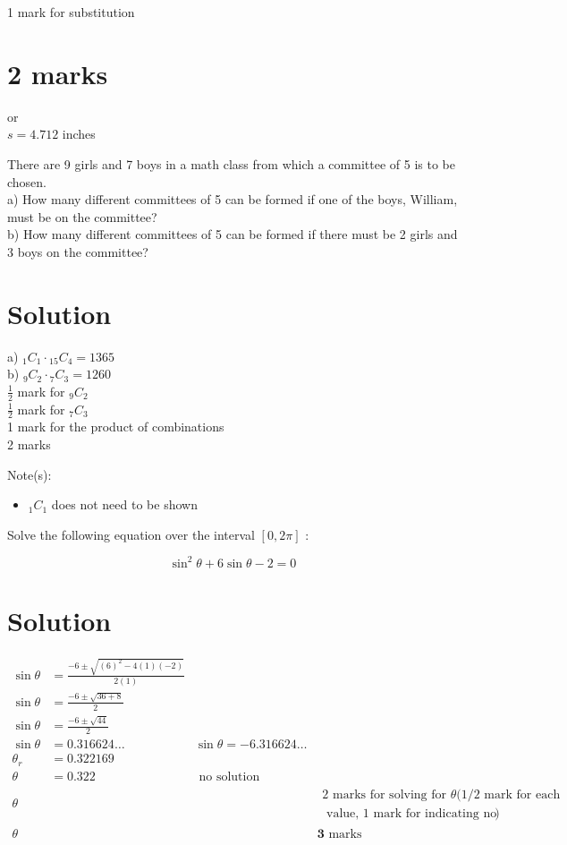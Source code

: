 \documentclass[10pt]{article}
\begin{document}
1 mark for substitution

\section*{2 marks}
or\\
$s=4.712$ inches

There are 9 girls and 7 boys in a math class from which a committee of 5 is to be chosen.\\
a) How many different committees of 5 can be formed if one of the boys, William, must be on the committee?\\
b) How many different committees of 5 can be formed if there must be 2 girls and 3 boys on the committee?

\section*{Solution}
a) ${ }_{1} C_{1} \cdot{ }_{15} C_{4}=1365$\\
b) ${ }_{9} C_{2} \cdot{ }_{7} C_{3}=1260$\\
$\frac{1}{2}$ mark for ${ }_{9} C_{2}$\\
$\frac{1}{2}$ mark for ${ }_{7} C_{3}$\\
1 mark for the product of combinations\\
2 marks

Note(s):

\begin{itemize}
  \item ${ }_{1} C_{1}$ does not need to be shown
\end{itemize}

Solve the following equation over the interval $[0,2 \pi]$ :

$$
\sin ^{2} \theta+6 \sin \theta-2=0
$$

\section*{Solution}
$$
\begin{aligned}
\sin \theta & =\frac{-6 \pm \sqrt{(6)^{2}-4(1)(-2)}}{2(1)} & & \\
\sin \theta & =\frac{-6 \pm \sqrt{36+8}}{2} & & \\
\sin \theta & =\frac{-6 \pm \sqrt{44}}{2} & & \\
\sin \theta & =0.316624 \ldots & \sin \theta=-6.316624 \ldots & \\
\theta_{r} & =0.322169 & & \\
\theta & =0.322 & \text { no solution } & \\
\theta & & & \begin{array}{l}
2 \text { marks for solving for } \theta(1 / 2 \text { mark for each } \\
\text { value, } 1 \text { mark for indicating no solution })
\end{array} \\
\theta & & & \mathbf{3} \text { marks }
\end{aligned}
$$
\end{document}
